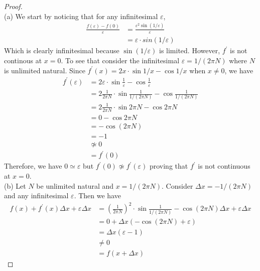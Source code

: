 \documentclass[a4paper, 11pt, openany]{book}
\theoremstyle{plain}
\theoremstyle{plain}
\newcommand{\p}{\prime}
\newcommand{\ep}{\varepsilon}
\newcommand{\Del}{\Delta}
\begin{document}
    \begin{proof} $ $ \\
      (a) We start by noticing that for any infinitesimal $\ep$, 
      \begin{align*}
        \frac{f(\ep)-f(0)}{\ep} &=\frac{\ep^2 \sin (1/\ep)}{\ep}  \\
        &= \ep \cdot sin(1/\ep)
      \end{align*}
      Which is clearly infinitesimal because $\sin(1/\ep)$ is limited. However, $f^\p$ is not continous at $x=0$. To see that consider the infinitesimal $\ep=1/(2 \pi N)$ where $N$ is unlimited natural. Since $f^\p(x)=2x \cdot \sin 1/x - \cos 1/x$ when $x\not =0$, we have 
      \begin{align*}
        f^\p (\ep) &= 2\ep \cdot \sin \frac{1}{\ep}-\cos \frac{1}{\ep} \\
        &=2 \frac{1}{2 \pi N} \cdot \sin \frac{1}{1/(2 \pi N)} - \cos \frac{1}{1/(2 \pi N)} \\
        &=2 \frac{1}{2\pi N} \cdot \sin 2 \pi N - \cos 2 \pi N \\
        &= 0-\cos 2 \pi N \\
        &=-\cos (2\pi N) \\
        &=-1 \\
        &\not \simeq 0 \\
        &=f^\p(0)
      \end{align*}
      Therefore, we have $0 \simeq \ep$ but $f^\p(0) \not \simeq f^\p(\ep)$ proving that $f^\p$ is not continuous at $x=0$. \\

      (b) Let $N$ be unlimited natural and $x=1/(2 \pi N)$. Consider $\Del x=-1/(2 \pi N)$ and any infinitesimal $\ep$. Then we have
      \begin{align*}
        f(x)+f^\p (x) \Del x+\ep \Del x &=\left(\frac{1}{2 \pi N}\right)^2 \cdot \sin \frac{1}{1/(2 \pi N)}-\cos (2 \pi N) \Del x + \ep \Del x \\
        &=0+\Del x (-\cos (2\pi N)+\ep) \\
        &=\Del x (\ep -1) \\
        & \not = 0 \\
        &=f(x+\Del x)
      \end{align*}
    \end{proof}
\end{document}
